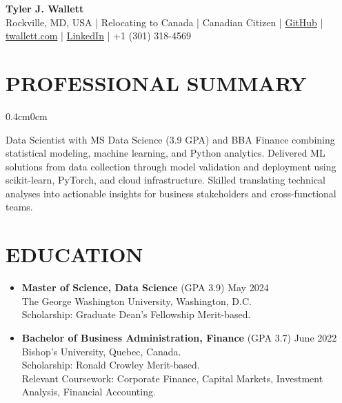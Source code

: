 \documentclass[a4paper,9pt]{extarticle}
\begin{document}
\thispagestyle{firstpage}

\begin{center}
\textbf{\Huge Tyler J. Wallett }\\[3pt] %
Rockville, MD, USA | Relocating to Canada | Canadian Citizen | \href{https://github.com/twallett}{GitHub} | \href{https://www.twallett.com}{twallett.com} | \href{https://www.linkedin.com/in/twallett/}{LinkedIn} | +1 (301) 318-4569  %
\end{center}

\section*{PROFESSIONAL SUMMARY}

\begin{adjustwidth}{0.4cm}{0cm}

Data Scientist with MS Data Science (3.9 GPA) and BBA Finance combining statistical modeling, machine learning, and Python analytics. Delivered ML solutions from data collection through model validation and deployment using scikit-learn, PyTorch, and cloud infrastructure. Skilled translating technical analyses into actionable insights for business stakeholders and cross-functional teams.

\end{adjustwidth}

\section*{EDUCATION}

\begin{itemize}[leftmargin=0.4cm, label={}]
    \item \textbf{Master of Science, Data Science} (GPA 3.9) \hfill May 2024 \\ 
    The George Washington University, Washington, D.C. \\ 
    Scholarship: Graduate Dean's Fellowship Merit-based.
\end{itemize}

\noindent
\begin{itemize}[leftmargin=0.4cm, label={}]
    \item \textbf{Bachelor of Business Administration, Finance} (GPA 3.7) \hfill June 2022 \\
    Bishop's University, Quebec, Canada. \\ 
    Scholarship: Ronald Crowley Merit-based. \\
    Relevant Coursework: Corporate Finance, Capital Markets, Investment Analysis, Financial Accounting.
\end{itemize}
\end{document}
